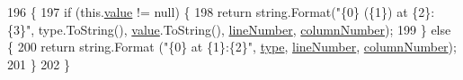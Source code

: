 \begin{DoxyCode}
196                                           \{
197             \textcolor{keywordflow}{if} (this.\hyperlink{a00079_a3df6b32d6190a639619a3f064c2154e2}{value} != null) \{
198                 \textcolor{keywordflow}{return} string.Format(\textcolor{stringliteral}{"\{0\} (\{1\}) at \{2\}:\{3\}"}, type.ToString(), 
      \hyperlink{a00079_a3df6b32d6190a639619a3f064c2154e2}{value}.ToString(), \hyperlink{a00079_a80fe710713201bb793a41452e314a721}{lineNumber}, \hyperlink{a00079_a9a0f0a8a7ab1e90ab48f15192323ffca}{columnNumber});
199             \} \textcolor{keywordflow}{else} \{
200                 \textcolor{keywordflow}{return} string.Format (\textcolor{stringliteral}{"\{0\} at \{1\}:\{2\}"}, \hyperlink{a00079_a471a25da67fda0524f2375f9a882aafa}{type}, \hyperlink{a00079_a80fe710713201bb793a41452e314a721}{lineNumber}, 
      \hyperlink{a00079_a9a0f0a8a7ab1e90ab48f15192323ffca}{columnNumber});
201             \}
202         \}
\end{DoxyCode}


